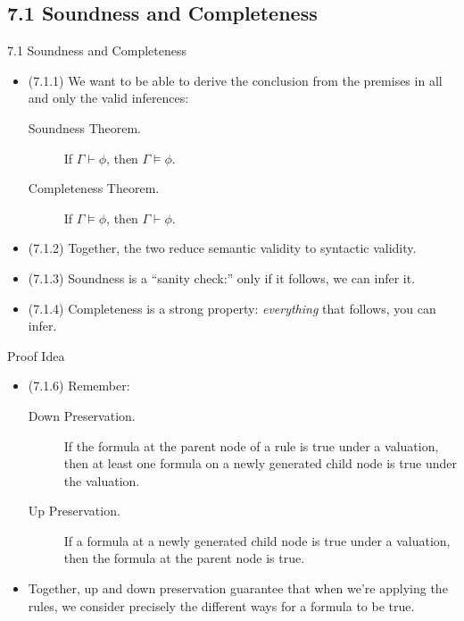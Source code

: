 \documentclass[../slides.tex]{subfiles}
\begin{document}
\subsection{7.1 Soundness and Completeness}

\begin{frame}{7.1 Soundness and Completeness}

	\begin{itemize}
		
		\item (7.1.1) We want to be able to  derive the conclusion from the premises in all and only the valid inferences:
		
				\begin{description}
		
			\item[Soundness Theorem.] If $\Gamma\vdash\phi$, then $\Gamma\vDash\phi$.
			
			\item[Completeness Theorem.] If $\Gamma\vDash\phi$, then $\Gamma\vdash\phi$.
		
		\end{description}
	
		\item (7.1.2) Together, the two reduce semantic validity to syntactic validity.
	
		\item (7.1.3) Soundness is a ``sanity check:'' only if it follows, we can infer it.
		
		\item (7.1.4) Completeness is a strong property: \emph{everything} that follows, you can infer.
		
	\end{itemize}

\end{frame}

\begin{frame}{Proof Idea}

	\begin{itemize}
	
		\item (7.1.6) Remember:
		
		\begin{description}
			
				\item[Down Preservation.] If the formula at the parent node of a rule is true under a valuation, then at least one formula on a newly generated child node is true under the valuation.
				
				\item[Up Preservation.] If a formula at a newly generated child node is true under a valuation, then the formula at the parent node is true.
				
		\end{description}
		
		\item Together, up and down preservation guarantee that when we're applying the rules, we consider precisely the different ways for a formula to be true.
	
	\end{itemize}


\end{frame}
\end{document}
